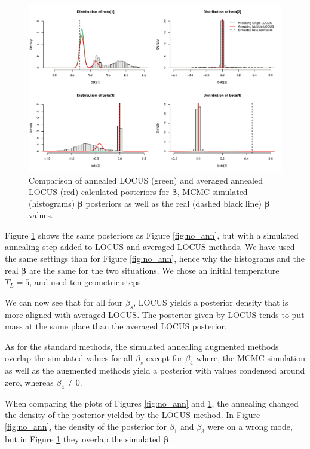 \documentclass[a4paper, 11pt]{report}
\numberwithin{equation}{chapter}
\begin{document}
\begin{figure}[h]
\includegraphics[width=\textwidth, bb=0 0 800px 600px]{images/annealing.pdf}
\caption{\label{fig:ann}Comparison of annealed LOCUS (green) and averaged annealed LOCUS (red) calculated posteriors for $\boldsymbol{\beta}$, MCMC simulated (histograms) $\boldsymbol{\beta}$ posteriors as well as the real (dashed black line) $\boldsymbol{\beta}$ values.}
\end{figure}
Figure \ref{fig:ann} shows the same posteriors as Figure \ref{fig:no_ann}, but with a simulated annealing step added to LOCUS and averaged LOCUS methods. We have used the same settings than for Figure \ref{fig:no_ann}, hence why the histograms and the real $
\boldsymbol{\beta}$ are the same for the two situations. We chose an initial temperature $T_L = 5$, and used ten geometric steps.

We can now see that for all four $\beta_s$, LOCUS yields a posterior density that is more aligned with averaged LOCUS. The posterior given by LOCUS tends to put mass at the same place than the averaged LOCUS posterior.

As for the standard methods, the simulated annealing augmented methods overlap the simulated values for all $\beta_s$ except for $\beta_4$ where, the MCMC simulation as well as the augmented methods yield a posterior with values condensed around zero, whereas $\beta_4 \neq 0$.

When comparing the plots of Figures \ref{fig:no_ann} and \ref{fig:ann}, the annealing changed the density of the posterior yielded by the LOCUS method. In Figure \ref{fig:no_ann}, the density of the posterior for $\beta_1$ and $\beta_3$ were on a wrong mode, but in Figure \ref{fig:ann} they overlap the simulated $\boldsymbol{\beta}$. 
\end{document}
